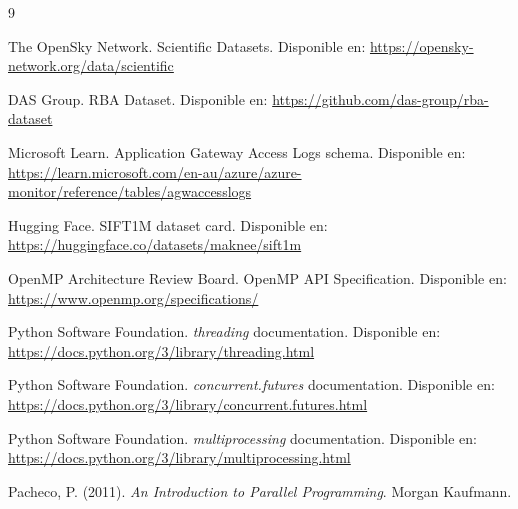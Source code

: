 \documentclass[letterpaper,11pt]{article}
\begin{document}
\begin{thebibliography}{9}

The OpenSky Network. Scientific Datasets. Disponible en:
\url{https://opensky-network.org/data/scientific}

DAS Group. RBA Dataset. Disponible en:
\url{https://github.com/das-group/rba-dataset}

Microsoft Learn. Application Gateway Access Logs schema. Disponible en:
\url{https://learn.microsoft.com/en-au/azure/azure-monitor/reference/tables/agwaccesslogs}

Hugging Face. SIFT1M dataset card. Disponible en:
\url{https://huggingface.co/datasets/maknee/sift1m}

OpenMP Architecture Review Board. OpenMP API Specification. Disponible en:
\url{https://www.openmp.org/specifications/}

Python Software Foundation. \textit{threading} documentation. Disponible en:
\url{https://docs.python.org/3/library/threading.html}

Python Software Foundation. \textit{concurrent.futures} documentation. Disponible en:
\url{https://docs.python.org/3/library/concurrent.futures.html}

Python Software Foundation. \textit{multiprocessing} documentation. Disponible en:
\url{https://docs.python.org/3/library/multiprocessing.html}

Pacheco, P. (2011). \textit{An Introduction to Parallel Programming}. Morgan Kaufmann.

\end{thebibliography}
\end{document}
